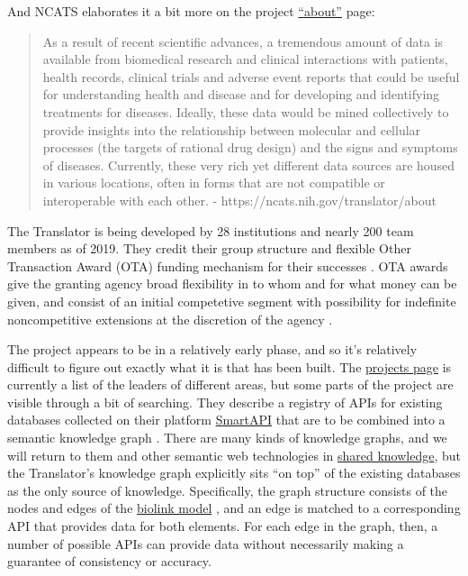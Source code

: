 \documentclass[notoc]{tufte-book}
\begin{document}
And NCATS elaborates it a bit more on the project
\href{https://ncats.nih.gov/translator/about}{``about''} page:

\begin{quote}
As a result of recent scientific advances, a tremendous amount of data
is available from biomedical research and clinical interactions with
patients, health records, clinical trials and adverse event reports that
could be useful for understanding health and disease and for developing
and identifying treatments for diseases. Ideally, these data would be
mined collectively to provide insights into the relationship between
molecular and cellular processes (the targets of rational drug design)
and the signs and symptoms of diseases. Currently, these very rich yet
different data sources are housed in various locations, often in forms
that are not compatible or interoperable with each other. -
https://ncats.nih.gov/translator/about
\end{quote}

The Translator is being developed by 28 institutions and nearly 200 team
members as of 2019. They credit their group structure and flexible Other
Transaction Award (OTA) funding mechanism for their successes \citep{consortiumBiomedicalDataTranslator2019} . OTA awards give the
granting agency broad flexibility in to whom and for what money can be
given, and consist of an initial competetive segment with possibility
for indefinite noncompetitive extensions at the discretion of the agency
\citep{fleisherOtherTransactionAward2019} .

The project appears to be in a relatively early phase, and so it's
relatively difficult to figure out exactly what it is that has been
built. The
\href{https://web.archive.org/web/20210710012427/https://ncats.nih.gov/translator/projects}{projects
page} is currently a list of the leaders of different areas, but some
parts of the project are visible through a bit of searching. They
describe a registry of APIs for existing databases collected on their
platform \href{https://smart-api.info/portal/translator}{SmartAPI} that
are to be combined into a semantic knowledge graph \citep{consortiumUniversalBiomedicalData2019} . There are many kinds of
knowledge graphs, and we will return to them and other semantic web
technologies in \protect\hyperlink{shared-knowledge}{shared knowledge},
but the Translator's knowledge graph explicitly sits ``on top'' of the
existing databases as the only source of knowledge. Specifically, the
graph structure consists of the nodes and edges of the
\href{https://github.com/biolink/biolink-model}{biolink model} \citep{bruskiewichBiolinkBiolinkmodel2021} , and an edge is matched to a
corresponding API that provides data for both elements. For each edge in
the graph, then, a number of possible APIs can provide data without
necessarily making a guarantee of consistency or accuracy.
\end{document}
